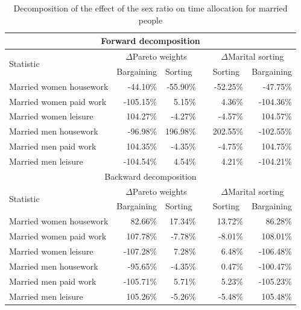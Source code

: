 \documentclass[12pt]{article}
\begin{document}
\begin{table}[htbp]
	\centering
	\caption{Decomposition of the effect of the sex ratio on time allocation for married people}
	\begin{tabular}{lrrrrr}
		\toprule
		\multicolumn{6}{c}{Forward decomposition} \\
		\midrule
		\multirow{2}[4]{*}{Statistic} & \multicolumn{2}{c}{$\Delta$Pareto weights} &       & \multicolumn{2}{c}{$\Delta$Marital sorting} \\
		\cmidrule{2-3}\cmidrule{5-6}      & \multicolumn{1}{l}{Bargaining} & \multicolumn{1}{l}{Sorting} &       & \multicolumn{1}{l}{Sorting} & \multicolumn{1}{l}{Bargaining} \\
		\midrule
		Married women housework & -44.10\% & -55.90\% &       & -52.25\% & -47.75\% \\
		Married women paid work & -105.15\% & 5.15\% &       & 4.36\% & -104.36\% \\
		Married women leisure & 104.27\% & -4.27\% &       & -4.57\% & 104.57\% \\
		Married men housework & -96.98\% & 196.98\% &       & 202.55\% & -102.55\% \\
		Married men paid work & 104.35\% & -4.35\% &       & -4.75\% & 104.75\% \\
		Married men leisure & -104.54\% & 4.54\% &       & 4.21\% & -104.21\% \\
		\midrule
		\multicolumn{6}{c}{Backward decomposition} \\
		\midrule
		\multirow{2}[4]{*}{Statistic} & \multicolumn{2}{c}{$\Delta$Pareto weights} &       & \multicolumn{2}{c}{$\Delta$Marital sorting} \\
		\cmidrule{2-3}\cmidrule{5-6}      & \multicolumn{1}{l}{Bargaining} & \multicolumn{1}{l}{Sorting} &       & \multicolumn{1}{l}{Sorting} & \multicolumn{1}{l}{Bargaining} \\
		\midrule
		Married women housework & 82.66\% & 17.34\% &       & 13.72\% & 86.28\% \\
		Married women paid work & 107.78\% & -7.78\% &       & -8.01\% & 108.01\% \\
		Married women leisure & -107.28\% & 7.28\% &       & 6.48\% & -106.48\% \\
		Married men housework & -95.65\% & -4.35\% &       & 0.47\% & -100.47\% \\
		Married men paid work & -105.71\% & 5.71\% &       & 5.23\% & -105.23\% \\
		Married men leisure & 105.26\% & -5.26\% &       & -5.48\% & 105.48\% \\
		\bottomrule
		\bottomrule
	\end{tabular}
	\label{tab:sexratio_decomp}
\end{table}
\end{document}
